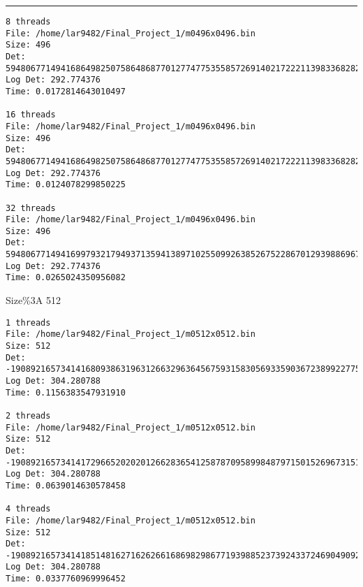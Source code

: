 \documentclass[letter, 12pt]{article}
\newenvironment{question}[1]{%
    \vspace{.2in}%
        \noindent{\bf #1}%
    \vspace{0.3em} \hrule \vspace{.1in}%
}{}
\begin{document}
\begin{question}{\large Appendix}
\begin{lstlisting}[style=CStyle]
8 threads
File: /home/lar9482/Final_Project_1/m0496x0496.bin
Size: 496
Det: 59480677149416864982507586486877012774775355857269140217222113983368282376534506498879878060967737061000272240180371608781244019763607738794325454698666828101501898121430167551061398924797050907802235521569708237341283645976938795438810838897330361136355975340284866778831041987894848455180288.000000
Log Det: 292.774376
Time: 0.0172814643010497

16 threads
File: /home/lar9482/Final_Project_1/m0496x0496.bin
Size: 496
Det: 59480677149416864982507586486877012774775355857269140217222113983368282376534506498879878060967737061000272240180371608781244019763607738794325454698666828101501898121430167551061398924797050907802235521569708237341283645976938795438810838897330361136355975340284866778831041987894848455180288.000000
Log Det: 292.774376
Time: 0.0124078299850225

32 threads
File: /home/lar9482/Final_Project_1/m0496x0496.bin
Size: 496
Det: 59480677149416997932179493713594138971025509926385267522867012939886967220181329303747249417846036640171914557626000531844861087664478519851079347439784406026580269502709318660295533550578283862639006499937353105166414676486160891740310462960114808546963940510854555937488722810259490815868928.000000
Log Det: 292.774376
Time: 0.0265024350956082
\end{lstlisting}

Size\%3A 512
\begin{lstlisting}[style=CStyle]
1 threads
File: /home/lar9482/Final_Project_1/m0512x0512.bin
Size: 512
Det: -19089216573414168093863196312663296364567593158305693359036723899227754497286004754820021374884647382599638277491257235455669988101754542925941120906744648254473068451850629088131872819022750389844854470472481791179852684976412060308404282395307991521626318530873105441275373237308295954606277415713898496.000000
Log Det: 304.280788
Time: 0.1156383547931910

2 threads
File: /home/lar9482/Final_Project_1/m0512x0512.bin
Size: 512
Det: -19089216573414172966520202012662836541258787095899848797150152696731517931239233361294366758097698615407171218496386848108128103806088634655526053508291671543466716608177338853770722797259265325239682215499305967579649424585601497151203245092745464394808126265355911855144774789447069495520572411670953984.000000
Log Det: 304.280788
Time: 0.0639014630578458

4 threads
File: /home/lar9482/Final_Project_1/m0512x0512.bin
Size: 512
Det: -19089216573414185148162716262661686982986771939885237392433724690490926516122304877480230216130326697426003571009210879739273393066923863979488385012159229765950836998994113267867847742850552663726751578066366408579141273608575089258200651836339146577762645601562927889818278669794003347806309901563592704.000000
Log Det: 304.280788
Time: 0.0337760969996452


\end{lstlisting}
\end{question}
\end{document}
